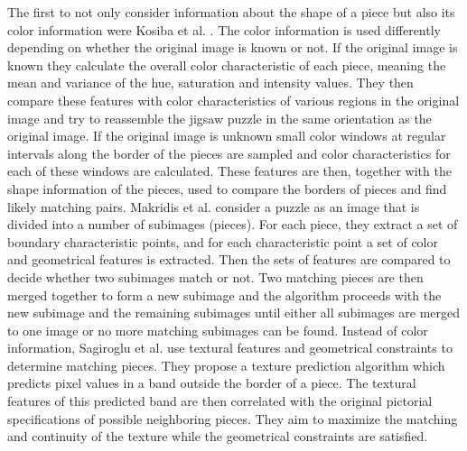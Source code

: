 \documentclass[11pt]{report}
\begin{document}
The first to not only consider information about the shape of a piece but also
its color information were Kosiba et al. \cite{kosiba1994automatic}. The color
information is used differently depending on whether the original image is known
or not. If the original image is known they calculate the overall color
characteristic of each piece, meaning the mean and variance of the hue,
saturation and intensity values. They then compare these features with color
characteristics of various regions in the original image and try to reassemble
the jigsaw puzzle in the same orientation as the original image. If the
original image is unknown small color windows at regular intervals along the
border of the pieces are sampled and color characteristics for each of these
windows are calculated. These features are then, together with the shape
information of the pieces, used to compare the borders of pieces and find likely
matching pairs. Makridis et al. \cite{makridis2006new} consider a puzzle as an
image that is divided into a number of subimages (pieces). For each piece, they
extract a set of boundary characteristic points, and for each characteristic
point a set of color and geometrical features is extracted. Then the sets of
features are compared to decide whether two subimages match or not. Two matching
pieces are then merged together to form a new subimage and the algorithm
proceeds with the new subimage and the remaining subimages until either all
subimages are merged to one image or no more matching subimages can be found.
Instead of color information, Sagiroglu et al. \cite{sagiroglu2006texture} use
textural features and geometrical constraints to determine matching pieces. They
propose a texture prediction algorithm which predicts pixel values in a band
outside the border of a piece. The textural features of this predicted band are
then correlated with the original pictorial specifications of possible
neighboring pieces. They aim to maximize the matching and continuity of the
texture while the geometrical constraints are satisfied.
\end{document}
